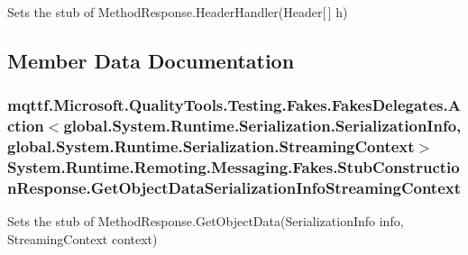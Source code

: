 Sets the stub of Method\-Response.\-Header\-Handler(\-Header\mbox{[}$\,$\mbox{]} h)



\subsection{Member Data Documentation}
\hypertarget{class_system_1_1_runtime_1_1_remoting_1_1_messaging_1_1_fakes_1_1_stub_construction_response_a3f305665acc0e75ef4681b9ebc025634}{
\subsubsection[{Get\-Object\-Data\-Serialization\-Info\-Streaming\-Context}]{\setlength{\rightskip}{0pt plus 5cm}mqttf.\-Microsoft.\-Quality\-Tools.\-Testing.\-Fakes.\-Fakes\-Delegates.\-Action$<$global.\-System.\-Runtime.\-Serialization.\-Serialization\-Info, global.\-System.\-Runtime.\-Serialization.\-Streaming\-Context$>$ System.\-Runtime.\-Remoting.\-Messaging.\-Fakes.\-Stub\-Construction\-Response.\-Get\-Object\-Data\-Serialization\-Info\-Streaming\-Context}}\label{class_system_1_1_runtime_1_1_remoting_1_1_messaging_1_1_fakes_1_1_stub_construction_response_a3f305665acc0e75ef4681b9ebc025634}


Sets the stub of Method\-Response.\-Get\-Object\-Data(\-Serialization\-Info info, Streaming\-Context context)

